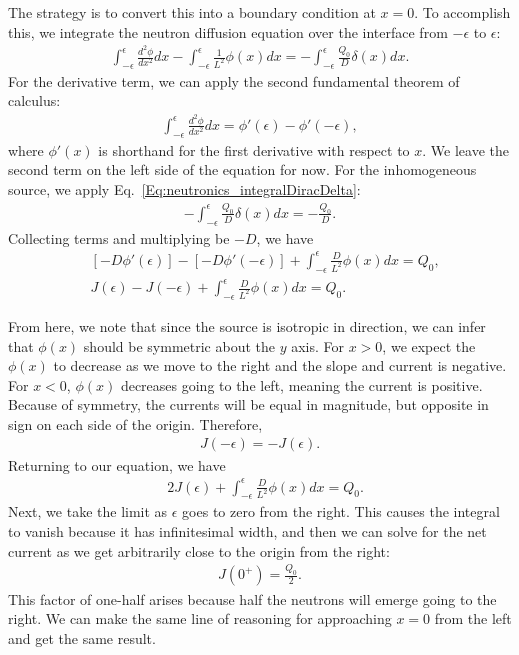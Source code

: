 The strategy is to convert this into a boundary condition at $x = 0$. To accomplish this, we integrate the neutron diffusion equation over the interface from $-\epsilon$ to $\epsilon$:
\begin{align}
  \int_{-\epsilon}^\epsilon \frac{d^2 \phi}{dx^2} dx - \int_{-\epsilon}^\epsilon  \frac{1}{L^2} \phi(x) dx = -\int_{-\epsilon}^\epsilon  \frac{Q_0}{D} \delta( x ) dx.
\end{align}
For the derivative term, we can apply the second fundamental theorem of calculus:
\begin{align}
  \int_{-\epsilon}^\epsilon \frac{d^2 \phi}{dx^2} dx = \phi'(\epsilon) - \phi'(-\epsilon),
\end{align}
where $\phi'(x)$ is shorthand for the first derivative with respect to $x$. We leave the second term on the left side of the equation for now. For the inhomogeneous source, we apply Eq.~\eqref{Eq:neutronics_integralDiracDelta}:
\begin{align}
  -\int_{-\epsilon}^\epsilon  \frac{Q_0}{D} \delta( x ) dx = -\frac{Q_0}{D} .
\end{align}
Collecting terms and multiplying be $-D$, we have
\begin{align}
  &\left[ -D \phi'(\epsilon) \right] - \left[ -D \phi'(-\epsilon)  \right] + \int_{-\epsilon}^\epsilon  \frac{D}{L^2} \phi(x) dx = Q_0, \nonumber \\
  &J(\epsilon) - J(-\epsilon) + \int_{-\epsilon}^\epsilon  \frac{D}{L^2} \phi(x) dx = Q_0.
\end{align}

From here, we note that since the source is isotropic in direction, we can infer that $\phi(x)$ should be symmetric about the $y$ axis. For $x > 0$, we expect the $\phi(x)$ to decrease as we move to the right and the slope and current is negative. For $x < 0$, $\phi(x)$ decreases going to the left, meaning the current is positive. Because of symmetry, the currents will be equal in magnitude, but opposite in sign on each side of the origin. Therefore,
\begin{align}
  J(-\epsilon) = -J(\epsilon).
\end{align}
Returning to our equation, we have
\begin{align}
  &2 J(\epsilon) + \int_{-\epsilon}^\epsilon  \frac{D}{L^2} \phi(x) dx = Q_0.
\end{align}
Next, we take the limit as $\epsilon$ goes to zero from the right. This causes the integral to vanish because it has infinitesimal width, and then we can solve for the net current as we get arbitrarily close to the origin from the right:
\begin{align}
  J(0^+) = \frac{ Q_0 }{ 2 } .
\end{align}
This factor of one-half arises because half the neutrons will emerge going to the right. We can make the same line of reasoning for approaching $x = 0$ from the left and get the same result.

